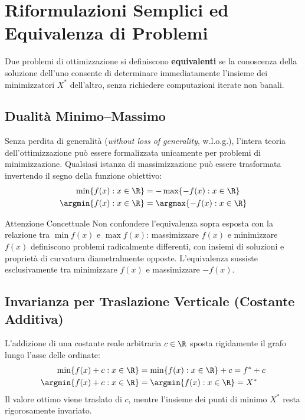 \FloatBarrier
\section{Riformulazioni Semplici ed Equivalenza di Problemi}
\label{sec:opt-riformulazioni-equivalenza}

Due problemi di ottimizzazione si definiscono \textbf{equivalenti} se la conoscenza della soluzione dell'uno consente di determinare immediatamente l'insieme dei minimizzatori $X^*$ dell'altro, senza richiedere computazioni iterate non banali.

\subsection{Dualit\`a Minimo--Massimo}
Senza perdita di generalit\`a (\textit{without loss of generality}, w.l.o.g.), l'intera teoria dell'ottimizzazione pu\`o essere formalizzata unicamente per problemi di minimizzazione. Qualsiasi istanza di massimizzazione pu\`o essere trasformata invertendo il segno della funzione obiettivo:
\begin{align}
\min \{ f(x) : x \in \R \} &= - \max \{ -f(x) : x \in \R \} \\
\argmin \{ f(x) : x \in \R \} &= \argmax \{ -f(x) : x \in \R \}
\end{align}

\begin{alertblock}{Attenzione Concettuale}
Non confondere l'equivalenza sopra esposta con la relazione tra $\min f(x)$ e $\max f(x)$: massimizzare $f(x)$ e minimizzare $f(x)$ definiscono problemi radicalmente differenti, con insiemi di soluzioni e propriet\`a di curvatura diametralmente opposte. L'equivalenza sussiste esclusivamente tra minimizzare $f(x)$ e massimizzare $-f(x)$.
\end{alertblock}

\subsection{Invarianza per Traslazione Verticale (Costante Additiva)}
L'addizione di una costante reale arbitraria $c \in \R$ sposta rigidamente il grafo lungo l'asse delle ordinate:
\begin{align}
\min \{ f(x) + c : x \in \R \} &= \min \{ f(x) : x \in \R \} + c = f^* + c \\
\argmin \{ f(x) + c : x \in \R \} &= \argmin \{ f(x) : x \in \R \} = X^*
\end{align}
Il valore ottimo viene traslato di $c$, mentre l'insieme dei punti di minimo $X^*$ resta rigorosamente invariato.


